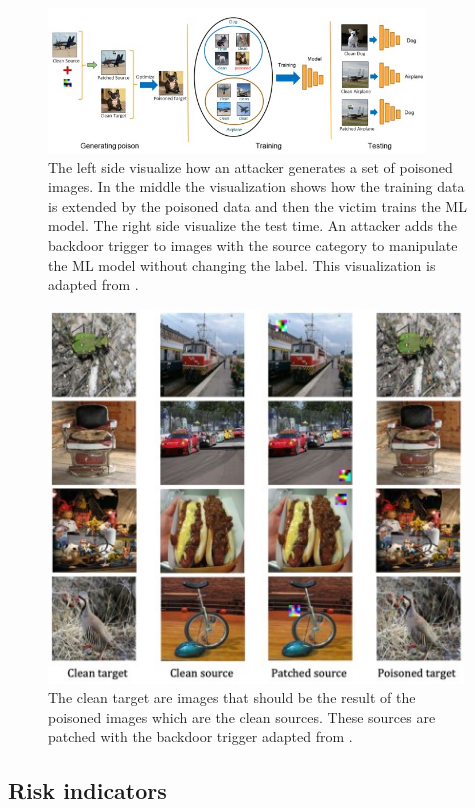 \begin{figure}[ht!]
  \centering
  \includegraphics[width=10cm]{pictures/procedure_hidden_trigger.jpg}
  \caption{The left side visualize how an attacker generates a set of poisoned images. In the middle the visualization shows how the training data is extended by the poisoned data and then the victim trains the ML model. The right side visualize the test time. An attacker adds the backdoor trigger to images with the source category to manipulate the ML model without changing the label. This visualization is adapted from \cite{DBLP:journals/corr/abs-1910-00033}.}
  \label{fig:procedure_hidden_trigger}
\end{figure}

\begin{figure}[ht!]
  \centering
  \includegraphics[width=11cm]{pictures/poisoned_hidden_trigger.jpg}
  \caption{The clean target are images that should be the result of the poisoned images which are the clean sources. These sources are patched with the backdoor trigger adapted from \cite{DBLP:journals/corr/abs-1910-00033}.}
  \label{fig:poisoned_hidden_trigger}
\end{figure}

\subsection{Risk indicators}
\label{sec:risk_indicators}

